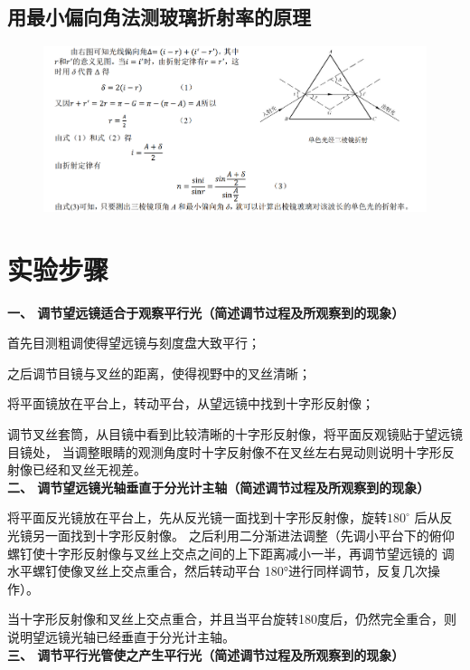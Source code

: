 \documentclass[UTF8]{ctexart}
\begin{document}
\subsection{用最小偏向角法测玻璃折射率的原理}

    \begin{figure}[H]
        \centering
        \includegraphics[scale=0.55]{最小偏向角原理.png}
    \end{figure}
    

\section{实验步骤}

\noindent  \textbf{一、 调节望远镜适合于观察平行光（简述调节过程及所观察到的现象）}

首先目测粗调使得望远镜与刻度盘大致平行；

之后调节目镜与叉丝的距离，使得视野中的叉丝清晰；

将平面镜放在平台上，转动平台，从望远镜中找到十字形反射像；

调节叉丝套筒，从目镜中看到比较清晰的十字形反射像，将平面反观镜贴于望远镜目镜处，
当调整眼睛的观测角度时十字反射像不在叉丝左右晃动则说明十字形反射像已经和叉丝无视差。
\\

\noindent  \textbf{二、 调节望远镜光轴垂直于分光计主轴（简述调节过程及所观察到的现象）}

将平面反光镜放在平台上，先从反光镜一面找到十字形反射像，旋转$180^\circ$ 后从反光镜另一面找到十字形反射像。
之后利用二分渐进法调整（先调小平台下的俯仰螺钉使十字形反射像与叉丝上交点之间的上下距离减小一半，再调节望远镜的
调水平螺钉使像叉丝上交点重合，然后转动平台 180°进行同样调节，反复几次操作）。

当十字形反射像和叉丝上交点重合，并且当平台旋转180度后，仍然完全重合，则说明望远镜光轴已经垂直于分光计主轴。
\\

\noindent  \textbf{三、 调节平行光管使之产生平行光（简述调节过程及所观察到的现象）}
\end{document}

